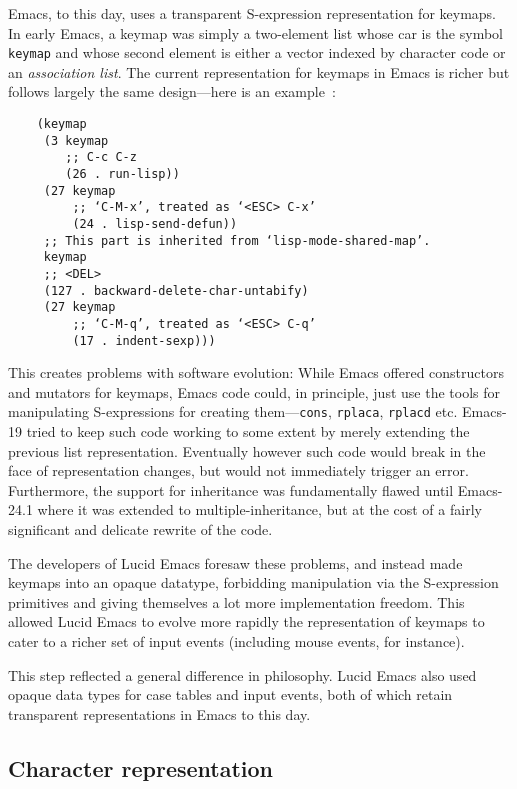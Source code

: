 \documentclass[format=acmsmall, review]{acmart}
\begin{document}
Emacs, to this day, uses a transparent
S-expression representation for keymaps.
In early Emacs, a keymap was
simply a two-element list whose car is the symbol \texttt{keymap} and
whose second element is either a vector indexed by character code or an
\emph{association list}.
The current representation for keymaps in Emacs is richer but follows
largely the same design---here is an example~\cite{ELispManual2018}:
\begin{verbatim}
    (keymap
     (3 keymap
        ;; C-c C-z
        (26 . run-lisp))
     (27 keymap
         ;; ‘C-M-x’, treated as ‘<ESC> C-x’
         (24 . lisp-send-defun))
     ;; This part is inherited from ‘lisp-mode-shared-map’.
     keymap
     ;; <DEL>
     (127 . backward-delete-char-untabify)
     (27 keymap
         ;; ‘C-M-q’, treated as ‘<ESC> C-q’
         (17 . indent-sexp)))
\end{verbatim}
This creates problems with software evolution: While Emacs offered
constructors and mutators for keymaps, Emacs code could, in principle,
just use the tools for manipulating S-expressions for creating
them---\texttt{cons}, \texttt{rplaca}, \texttt{rplacd} etc.
Emacs-19 tried to keep such code working to some extent by merely
extending the previous list representation.
Eventually however such code would break in the face of representation
changes, but would not immediately trigger an error.  Furthermore, the
support for inheritance was fundamentally flawed until Emacs-24.1 where it
was extended to multiple-inheritance, but at the cost of a fairly significant
and delicate rewrite of the code.

The developers of Lucid Emacs foresaw these problems, and
instead made keymaps into an opaque datatype, forbidding manipulation via the
S-expression primitives and giving themselves a lot more implementation
freedom.  This allowed Lucid Emacs to evolve more rapidly the
representation of keymaps to cater to a richer set of input events
(including mouse events, for instance).

This step reflected a general difference in philosophy.  Lucid Emacs
also used opaque data types for case tables and input events, both of
which retain transparent representations in Emacs to this day.

\subsection{Character representation}
\label{sec:character-representation}
\end{document}
